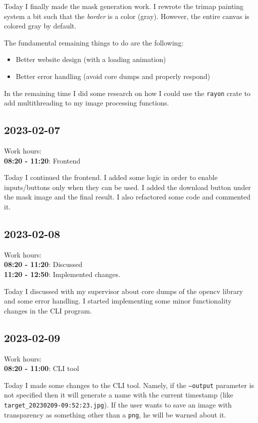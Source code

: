 \documentclass{article}
\begin{document}
Today I finally made the mask generation work.
I rewrote the trimap painting system a bit such that the \textit{border}
is a color (gray). However, the entire canvas is colored gray by default.

The fundamental remaining things to do are the following:
\begin{itemize}
    \item Better website design (with a loading animation)
    \item Better error handling (avoid core dumps and properly respond)
\end{itemize}

In the remaining time I did some research on how I could use the \texttt{rayon}
crate to add multithreading to my image processing functions.

\subsection{2023-02-07}

Work hours:\\
\textbf{08:20 - 11:20}: Frontend

Today I continued the frontend.
I added some logic in order to enable inputs/buttons only
when they can be used. I added the download button
under the mask image and the final result.
I also refactored some code and commented it.

\subsection{2023-02-08}

Work hours:\\
\textbf{08:20 - 11:20}: Discussed \\
\textbf{11:20 - 12:50}: Implemented changes.

Today I discussed with my supervisor about
core dumps of the opencv library and some
error handling. I started implementing some minor functionality changes
in the CLI program.

\subsection{2023-02-09}

Work hours:\\
\textbf{08:20 - 11:00}: CLI tool

Today I made some changes to the CLI tool. Namely,
if the \texttt{--output} parameter is not specified then it will
generate a name with the current timestamp (like \texttt{target\_20230209-09:52:23.jpg}). If the user
wants to save an image with transparency as something other than a \texttt{png}, he
will be warned about it.
\end{document}
